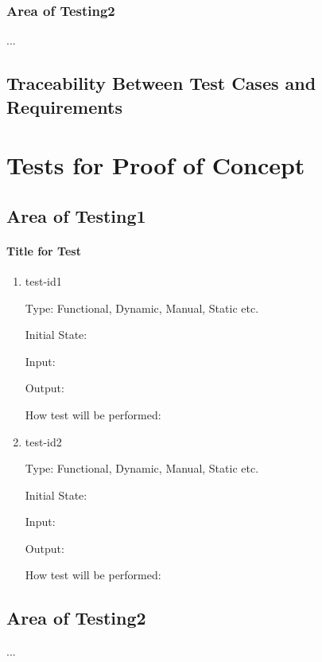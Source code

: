 \documentclass[12pt, titlepage]{article}
\begin{document}
\subsubsection{Area of Testing2}

...

\subsection{Traceability Between Test Cases and Requirements}

\section{Tests for Proof of Concept}

\subsection{Area of Testing1}

\paragraph{Title for Test}

\begin{enumerate}

\item{test-id1\\}

Type: Functional, Dynamic, Manual, Static etc.

Initial State:

Input:

Output:

How test will be performed:

\item{test-id2\\}

Type: Functional, Dynamic, Manual, Static etc.

Initial State:

Input:

Output:

How test will be performed:

\end{enumerate}

\subsection{Area of Testing2}

...
\end{document}
